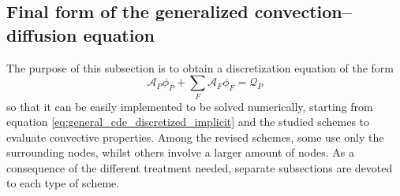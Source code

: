\subsection{Final form of the generalized convection--diffusion equation}

The purpose of this subsection is to obtain a discretization equation of the
form
\begin{equation} \label{eq:final_form_1}
	\mathcal{A}_P \phi_P + \sum_F \mathcal{A}_F \phi_F = \mathcal{Q}_P
\end{equation}
so that it can be easily implemented to be solved numerically, starting from
equation \eqref{eq:general_cde_discretized_implicit} and the studied schemes to
evaluate convective properties. Among the revised schemes, some use only the
surrounding nodes, whilst others involve a larger amount of nodes. As a
consequence of the different treatment needed, separate subsections are devoted
to each type of scheme.




